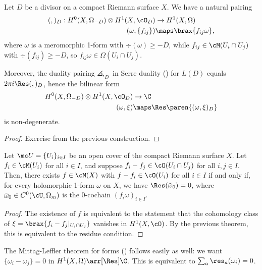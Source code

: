 \documentclass[11pt]{report}
\begin{document}
\begin{thm}
Let $D$ be a divisor on a compact Riemann surface $X$. We have a natural pairing 
\begin{align*}
(,)_D:H^0(X,\Omega_{-D})\otimes H^1(X,\cO_D) &\to H^1(X, \Omega) \\
(\omega, \{f_{ij}\}) & \maps \brax{f_{ij}\omega},
\end{align*}
where $\omega$ is a meromorphic 1-form with $\div(\omega)\geq -D$, while $f_{ij} \in \cM(U_i \cap U_j)$ with $\div(f_{ij}) \geq -D$, so $f_{ij}\omega \in \Omega(U_i \cap U_j)$. 

Moreover, the duality pairing $\angles, _D$ in Serre duality () for $L(D)$ equals $2\pi i \Res(,)_D$, hence the bilinear form
\begin{align*}
H^0(X,\Omega_{-D}) \otimes H^1(X,\cO_D) & \to \C \\ (\omega,\xi) & \maps \Res\paren{(\omega,\xi)_D}
\end{align*}
is non-degenerate.
\end{thm}

\begin{proof}
Exercise from the previous construction.
\end{proof}

\begin{thm} \label{thm:mittag-leffler-functions}
Let $\mc U=\{U_i\}_{i \in I}$ be an open cover of the compact Riemann surface $X$. Let $f_i \in \cM(U_i)$ for all $i \in I$, and suppose $f_i - f_j \in \cO(U_i \cap U_j)$ for all $i,j\in I$. Then, there exists $f \in \cM(X)$ with $f-f_i \in \cO(U_i)$ for all $i \in I$ if and only if, for every holomorphic 1-form $\omega$ on $X$, we have $\Res(\tilde\omega_0)=0$, where $\tilde \omega_0 \in C^0(\cU,\Omega_m)$ is the 0-cochain $(f_i\omega)_{i\in I}$.
\end{thm}

\begin{proof}
The existence of $f$ is equivalent to the statement that the cohomology class of $\xi = \brax{f_i -f_j|_{U_i \cap U_j}}$ vanishes in $H^1(X,\cO)$. By the previous theorem, this is equivalent to the residue condition.
\end{proof}

\begin{rmk}
The Mittag-Leffler theorem for forms () follows easily as well: we want $\{\omega_i-\omega_j\}=0$ in $H^1(X,\Omega) \arr[\Res] \C$. This is equivalent to $\sum_a \res_a(\omega_i)=0$.
\end{rmk}
\end{document}
